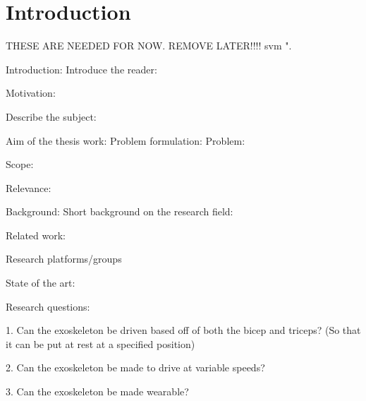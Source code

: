 \section{Introduction}
\label{section:intro}

THESE ARE NEEDED FOR NOW. REMOVE LATER!!!! \cite{IEEEtran, IEEEtranformatexample, webpage, FundConDep, exampleofjournalarticle, exampleofconferencepaper}
\ac{svm} \cite{exampleofconferencepaper}".

Introduction:
    Introduce the reader:

    Motivation:

    Describe the subject:

    Aim of the thesis work:
        Problem formulation: %
            Problem:

            Scope:
            
            Relevance: %


Background: 
    Short background on the research field:

    Related work:

    Research platforms/groups

    State of the art:





Research questions:

1.	Can the exoskeleton be driven based off of both the bicep and triceps? (So that it can be put at rest at a specified position)

2.	Can the exoskeleton be made to drive at variable speeds?

3.	Can the exoskeleton be made wearable?

